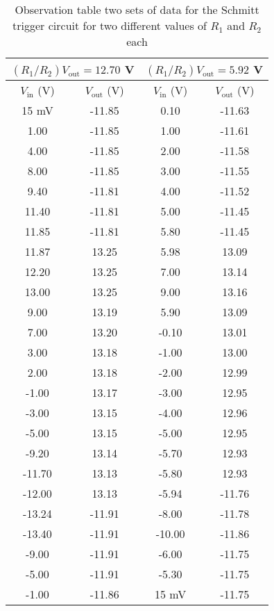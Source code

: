 \begin{table}[H]
    \centering
    \begin{tabular}{|c|c|c|c|} \hline
        \multicolumn{2}{|c|}{$(R_1/R_2) V_\text{out} = 12.70$ V} & \multicolumn{2}{c|}{$(R_1/R_2) V_\text{out}=5.92$ V} \\ \hline
        $V_\text{in}$ (V) & $V_\text{out}$ (V) & $V_\text{in}$ (V) & $V_\text{out}$ (V) \\ \hline
        15 mV & -11.85 &   0.10    & -11.63 \\
        1.00      & -11.85 &   1.00      & -11.61 \\
        4.00      & -11.85 &   2.00      & -11.58 \\
        8.00      & -11.85 &   3.00      & -11.55 \\
        9.40    & -11.81 &   4.00      & -11.52 \\
       11.40    & -11.81 &   5.00      & -11.45 \\
       11.85   & -11.81 &   5.80    & -11.45 \\
       11.87   &  13.25 &   5.98   &  13.09 \\
       12.20   &  13.25 &   7.00      &  13.14 \\
       13.00      &  13.25 &   9.00      &  13.16 \\
        9.00      &  13.19 &   5.90    &  13.09 \\
        7.00      &  13.20 &  -0.10    &  13.01 \\
        3.00      &  13.18 &  -1.00      &  13.00    \\
        2.00      &  13.18 &  -2.00      &  12.99 \\
       -1.00      &  13.17 &  -3.00      &  12.95 \\
       -3.00      &  13.15 &  -4.00      &  12.96 \\
       -5.00      &  13.15 &  -5.00      &  12.95 \\
       -9.20    &  13.14 &  -5.70    &  12.93 \\
      -11.70    &  13.13 &  -5.80    &  12.93 \\
      -12.00      &  13.13 &  -5.94   & -11.76 \\
      -13.24   & -11.91 &  -8.00      & -11.78 \\
      -13.40   & -11.91 & -10.00      & -11.86 \\
       -9.00      & -11.91 &  -6.00      & -11.75 \\
       -5.00      & -11.91 &  -5.30    & -11.75 \\
       -1.00      & -11.86 &   15 mV & -11.75 \\ \hline
    \end{tabular}    
    \caption{Observation table two sets of data for the Schmitt trigger circuit for two different values of $R_1$ and $R_2$ each}
    \label{tab:6}
\end{table}